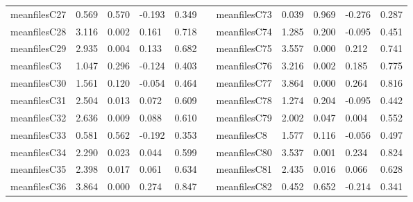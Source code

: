 \begin{table}[h!]
\begin{tabular}{lllllllllll}
meanfilesC27  & 0.569            & 0.570            & -0.193              & 0.349               &           & meanfilesC73  & 0.039            & 0.969            & -0.276              & 0.287               \\
meanfilesC28  & 3.116            & 0.002            & 0.161               & 0.718               &           & meanfilesC74  & 1.285            & 0.200            & -0.095              & 0.451               \\
meanfilesC29  & 2.935            & 0.004            & 0.133               & 0.682               &           & meanfilesC75  & 3.557            & 0.000            & 0.212               & 0.741               \\
meanfilesC3   & 1.047            & 0.296            & -0.124              & 0.403               &           & meanfilesC76  & 3.216            & 0.002            & 0.185               & 0.775               \\
meanfilesC30  & 1.561            & 0.120            & -0.054              & 0.464               &           & meanfilesC77  & 3.864            & 0.000            & 0.264               & 0.816               \\
meanfilesC31  & 2.504            & 0.013            & 0.072               & 0.609               &           & meanfilesC78  & 1.274            & 0.204            & -0.095              & 0.442               \\
meanfilesC32  & 2.636            & 0.009            & 0.088               & 0.610               &           & meanfilesC79  & 2.002            & 0.047            & 0.004               & 0.552               \\
meanfilesC33  & 0.581            & 0.562            & -0.192              & 0.353               &           & meanfilesC8   & 1.577            & 0.116            & -0.056              & 0.497               \\
meanfilesC34  & 2.290            & 0.023            & 0.044               & 0.599               &           & meanfilesC80  & 3.537            & 0.001            & 0.234               & 0.824               \\
meanfilesC35  & 2.398            & 0.017            & 0.061               & 0.634               &           & meanfilesC81  & 2.435            & 0.016            & 0.066               & 0.628               \\
meanfilesC36  & 3.864            & 0.000            & 0.274               & 0.847               &           & meanfilesC82  & 0.452            & 0.652            & -0.214              & 0.341               \\

\end{tabular}
\end{table}
